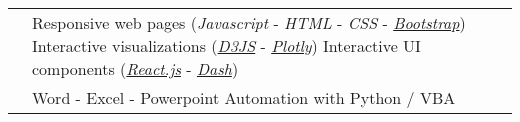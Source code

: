 \documentclass[a4paper]{cv}
\begin{document}
\begin{minipage}[t]{0.6\textwidth}
\begin{tabular}{R{0.21\textwidth} L{0.7\textwidth}}
 & Responsive web pages (\emph{Javascript} - \emph{HTML} - \emph{CSS} - \href{http://getbootstrap.com/}{\emph{Bootstrap}}) \tbl{} Interactive visualizations (\href{https://d3js.org}{\emph{D3JS}} - \href{https://plot.ly/}{\emph{Plotly}}) \tbl{} Interactive UI components (\href{https://reactjs.org}{\emph{React.js}} - \href{https://dash.plot.ly/}{\emph{Dash}}) \\

 & Word - Excel - Powerpoint \tbl{} Automation with Python / VBA\\

\end{tabular}

\vspace{5pt}

\end{minipage}
\hsepcol
\end{document}
